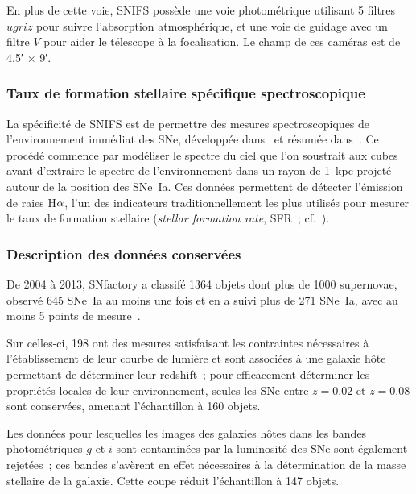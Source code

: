 \documentclass[../main/main.tex]{subfiles}
\begin{document}
En plus de cette voie, SNIFS possède une voie photométrique utilisant 5 filtres
$ugriz$ pour suivre l'absorption atmosphérique, et une voie de guidage avec un
filtre $V$ pour aider le télescope à la focalisation. Le champ de ces caméras
est de \ang{;4.5;} $\times$ \ang{;9;}.

\subsubsection{Taux de formation stellaire spécifique
spectroscopique}\label{sssec:snflssfr}

La spécificité de SNIFS est de permettre des mesures spectroscopiques de
l'environnement immédiat des SNe, développée dans~\cite{rigault2013} et résumée
dans~\cite{rigault2020}. Ce procédé commence par modéliser le spectre du ciel
que l'on soustrait aux cubes avant d'extraire le spectre de l'environnement dans
un rayon de \SI{1}{kpc} projeté autour de la position des SNe~Ia. Ces données
permettent de détecter l'émission de raies H$\alpha$, l'un des indicateurs
traditionnellement les plus utilisés pour mesurer le taux de formation stellaire
(\textit{stellar formation rate}, SFR~; cf.~\cite{kennicutt1998}).


\subsubsection{Description des données conservées}\label{sssec:snfdata}

De 2004 à 2013, SNfactory a classifé 1364 objets dont plus de 1000 supernovae,
observé 645 SNe~Ia au moins une fois et en a suivi plus de 271 SNe~Ia, avec au
moins 5 points de mesure~\citep{copin2013}.

Sur celles-ci, 198 ont des mesures satisfaisant les contraintes nécessaires à
l'établissement de leur courbe de lumière et sont associées à une galaxie hôte
permettant de déterminer leur redshift~; pour efficacement déterminer les
propriétés locales de leur environnement, seules les SNe entre $z = 0.02$ et $z
= 0.08$ sont conservées, amenant l'échantillon à 160 objets.

Les données pour lesquelles les images des galaxies hôtes dans les bandes
photométriques $g$ et $i$ sont contaminées par la luminosité des SNe sont
également rejetées~; ces bandes s'avèrent en effet nécessaires à la
détermination de la masse stellaire de la galaxie. Cette coupe réduit
l'échantillon à 147 objets.
\end{document}
